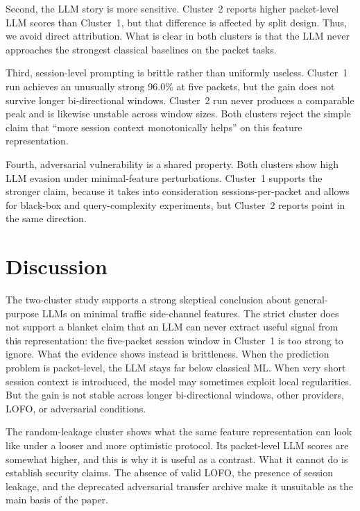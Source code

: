 \documentclass[conference]{IEEEtran}
\begin{document}
Second, the LLM story is more sensitive. Cluster~2 reports higher packet-level LLM scores than Cluster~1, but that difference is affected by split design. Thus, we avoid direct attribution. What is clear in both clusters is that the LLM never approaches the strongest classical baselines on the packet tasks.

Third, session-level prompting is brittle rather than uniformly useless. Cluster~1 run achieves an unusually strong 96.0\% at five packets, but the gain does not survive longer bi-directional windows. Cluster~2 run never produces a comparable peak and is likewise unstable across window sizes. Both clusters reject the simple claim that ``more session context monotonically helps'' on this feature representation.

Fourth, adversarial vulnerability is a shared property. Both clusters show high LLM evasion under minimal-feature perturbations. Cluster~1 supports the stronger claim, because it takes into consideration sessions-per-packet and allows for black-box and query-complexity experiments, but Cluster~2 reports point in the same direction.

\section{Discussion}
\label{sec:discussion}

The two-cluster study supports a strong skeptical conclusion about general-purpose LLMs on minimal traffic side-channel features. The strict cluster does not support a blanket claim that an LLM can never extract useful signal from this representation: the five-packet session window in Cluster~1 is too strong to ignore. What the evidence shows instead is brittleness. When the prediction problem is packet-level, the LLM stays far below classical ML. When very short session context is introduced, the model may sometimes exploit local regularities. But the gain is not stable across longer bi-directional windows, other providers, LOFO, or adversarial conditions.

The random-leakage cluster shows what the same feature representation can look like under a looser and more optimistic protocol. Its packet-level LLM scores are somewhat higher, and this is why it is useful as a contrast. What it cannot do is establish security claims. The absence of valid LOFO, the presence of session leakage, and the deprecated adversarial transfer archive make it unsuitable as the main basis of the paper.
\end{document}
